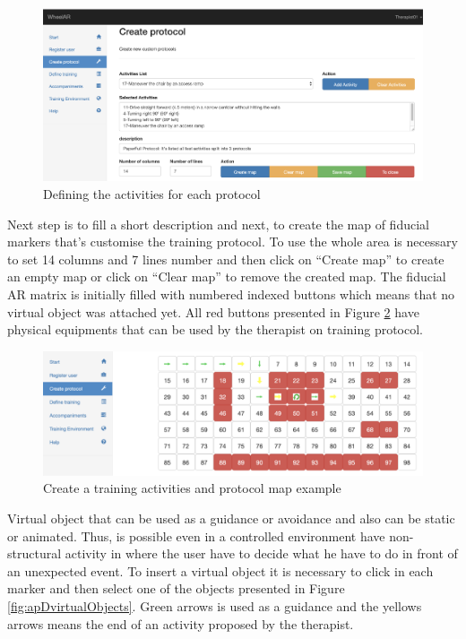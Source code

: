 \begin{figure}[!hbt]
\begin{center}
\includegraphics[width=0.95\linewidth]{img/apendiceD/tCreateProtocol01}
\caption{Defining the activities for each protocol} \label{fig:apDcreateProtocol01}
\end{center}
\end{figure}

Next step is to fill a short description and next, to create the map of fiducial markers that's customise the training protocol. To use the whole area is necessary to set 14 columns and 7 lines number and  then click on ``Create map'' to create an empty map or click on ``Clear map'' to remove the created map.
The fiducial AR matrix is initially filled with numbered indexed buttons which means that no virtual object was attached yet. All red buttons presented in Figure \ref{fig:apDcreateProtocol02}  have physical equipments that can be used by the therapist on training protocol.  

\begin{figure}[!hbt]
\begin{center}
\includegraphics[width=1\linewidth]{img/apendiceD/tCreateProtocol02}
\caption{Create a training activities and protocol map example} \label{fig:apDcreateProtocol02}
\end{center}
\vspace{-15pt}
\end{figure}

Virtual object that can be used as a guidance or avoidance and also can be static or animated. Thus, is possible even in a controlled environment have non-structural activity in where the user have to decide what he have to do in front of an unexpected event. To insert a virtual object it is necessary to click in each marker and then select one of the objects presented in Figure \ref{fig:apDvirtualObjects}. Green arrows is used as a guidance and the yellows arrows means the end of an activity proposed by the therapist. 

